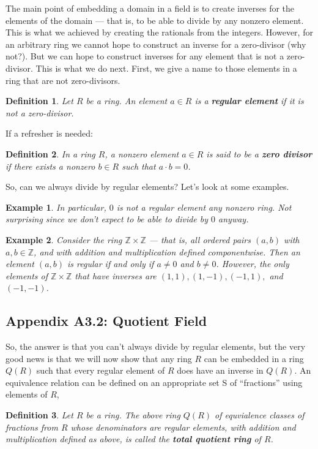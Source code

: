 \documentclass[12pt,reqno]{amsart}
\theoremstyle{plain}
\newtheorem{defi}{Definition}
\newtheorem{ex}{Example}
\newcommand{\zz}{\mathbb Z}
\begin{document}
The main point of embedding a domain in a field is to create inverses for the elements of the domain — that is, to be able to divide by any nonzero element. This is what we achieved by creating the rationals from the integers. However, for an arbitrary ring we cannot hope to construct an inverse for a zero-divisor (why not?). But we can hope to construct inverses for any element that is not a zero-divisor. This is what we do next. First, we give a name to those elements in a ring that are not zero-divisors.

\begin{defi} Let $R$ be a ring. An element $a \in R$ is a \textbf{regular element} if it is not a zero-divisor.
\end{defi} 

If a refresher is needed:
\begin{defi} In a ring $R$, a nonzero element $a\in R$ is said to be a \textbf{zero divisor} if there exists a nonzero $b \in R$ such that $a\cdot b = 0$.
\end{defi} 

 So, can we always divide by regular elements? Let's look at some examples.
 
\begin{ex} In particular, $0$ is not a regular element any nonzero ring. Not surprising since we don't expect to be able to divide by $0$ anyway. 
\end{ex} 
\begin{ex} Consider the ring $\zz \times \zz$ — that is, all ordered pairs $(a, b)$ with $a, b \in \zz$, and with addition and multiplication defined componentwise. Then an element $(a, b)$ is regular if and only if $a \neq 0$ and $b \neq 0$. However, the only elements of $\zz \times \zz$ that have inverses are $(1, 1), (1, -1), (-1, 1),$ and $(-1, -1)$.
\end{ex} 
\subsection{Appendix A3.2: Quotient Field}

So, the answer is that you can't always divide by regular elements, but the very good news is that we will now show that any ring $R$ can be embedded in a ring $Q(R)$ such that every regular element of $R$ does have an inverse in $Q(R)$. An equivalence relation can be defined on an appropriate set S of ``fractions” using elements of $R$,
\begin{defi}
Let $R$ be a ring. The above ring $Q(R)$ of equvialence classes of fractions from $R$ whose denominators are regular elements, with addition and multiplication defined as above, is called the \textbf{total quotient ring} of $R$.
\end{defi}
\end{document}
